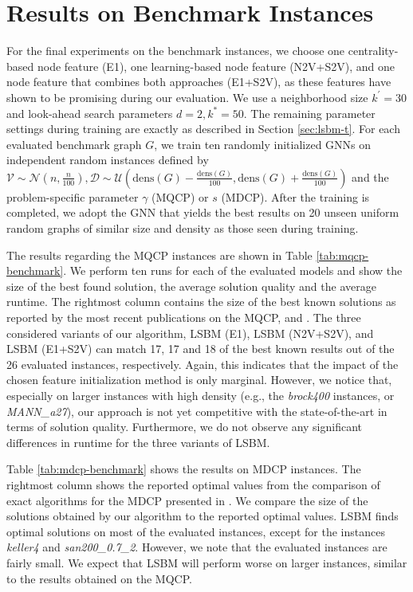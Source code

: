 \documentclass[draft,final]{vutinfth} %
\begin{document}
\section{Results on Benchmark Instances}\label{sec:benchmark-results}
For the final experiments on the benchmark instances, we choose one centrality-based node feature (E1), one learning-based node feature (N2V+S2V), and one node feature that combines both approaches (E1+S2V), as these features have shown to be promising during our evaluation. We use a neighborhood size $k^\prime=30$ and look-ahead search parameters $d=2, k^* = 50$. The remaining parameter settings during training are exactly as described in Section \ref{sec:lsbm-t}. 
For each evaluated benchmark graph $G$, we train ten randomly initialized GNNs on independent random instances defined by $\mathcal{V} \sim \mathcal{N}(n, \frac{n}{100}), \mathcal{D} \sim \mathcal{U}(\mathrm{dens}(G) - \frac{\mathrm{dens}(G)}{100}, \mathrm{dens}(G) + \frac{\mathrm{dens}(G)}{100})$ and the problem-specific parameter $\gamma$ (MQCP) or $s$ (MDCP). 
After the training is completed, we adopt the GNN that yields the best results on 20 unseen uniform random graphs of similar size and density as those seen during training. 

The results regarding the MQCP instances are shown in Table \ref{tab:mqcp-benchmark}. We perform ten runs for each of the evaluated models and show the size of the best found solution, the average solution quality and the average runtime. The rightmost column contains the size of the best known solutions as reported by the most recent publications on the MQCP, \cite{chen_nuqclq_2021} and \cite{peng_solving_2021}. 
The three considered variants of our algorithm, LSBM (E1), LSBM (N2V+S2V), and LSBM (E1+S2V) can match 17, 17 and 18 of the best known results out of the 26 evaluated instances, respectively. Again, this indicates that the impact of the chosen feature initialization method is only marginal. However, we notice that, especially on larger instances with high density (e.g., the \emph{brock400} instances, or \emph{MANN\_a27}), our approach is not yet competitive with the state-of-the-art in terms of solution quality. 
Furthermore, we do not observe any significant differences in runtime for the three variants of LSBM. 

Table \ref{tab:mdcp-benchmark} shows the results on MDCP instances. The rightmost column shows the reported optimal values from the comparison of exact algorithms for the MDCP presented in \cite{chen2021computing}. We compare the size of the solutions obtained by our algorithm to the reported optimal values. 
LSBM finds optimal solutions on most of the evaluated instances, except for the instances \emph{keller4} and \emph{san200\_0.7\_2}. However, we note that the evaluated instances are fairly small. We expect that LSBM will perform worse on larger instances, similar to the results obtained on the MQCP.  
\end{document}
